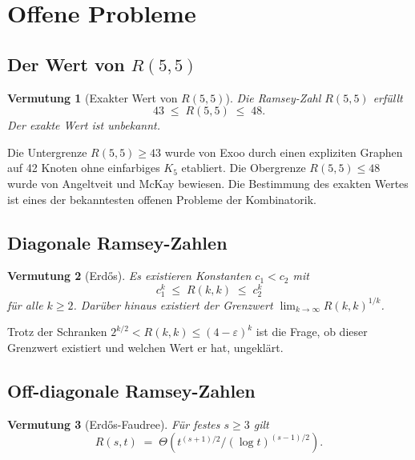 \documentclass[12pt,a4paper]{amsart}
\newtheorem{conjecture}{Vermutung}
\theoremstyle{definition}
\theoremstyle{remark}
\begin{document}
\section{Offene Probleme}

\subsection{Der Wert von \texorpdfstring{$R(5,5)$}{R(5,5)}}

\begin{conjecture}[Exakter Wert von $R(5,5)$]\label{verm:r55}
Die Ramsey-Zahl $R(5,5)$ erf\"ullt
\[
  43 \;\le\; R(5,5) \;\le\; 48.
\]
Der exakte Wert ist unbekannt.
\end{conjecture}

Die Untergrenze $R(5,5) \ge 43$ wurde von Exoo \cite{Exoo1989} durch einen
expliziten Graphen auf 42 Knoten ohne einfarbiges $K_5$ etabliert.  Die Obergrenze
$R(5,5) \le 48$ wurde von Angeltveit und McKay \cite{AngeltveitMcKay2017} bewiesen.
Die Bestimmung des exakten Wertes ist eines der bekanntesten offenen Probleme der
Kombinatorik.

\subsection{Diagonale Ramsey-Zahlen}

\begin{conjecture}[Erd\H{o}s]\label{verm:diagonal}
Es existieren Konstanten $c_1 < c_2$ mit
\[
  c_1^k \;\le\; R(k,k) \;\le\; c_2^k
\]
f\"ur alle $k \ge 2$.  Dar\"uber hinaus existiert der Grenzwert
$\lim_{k\to\infty} R(k,k)^{1/k}$.
\end{conjecture}

Trotz der Schranken $2^{k/2} < R(k,k) \le (4-\varepsilon)^k$ ist die Frage,
ob dieser Grenzwert existiert und welchen Wert er hat, ungekl\"art.

\subsection{Off-diagonale Ramsey-Zahlen}

\begin{conjecture}[Erd\H{o}s-Faudree]\label{verm:offdiag}
F\"ur festes $s \ge 3$ gilt
\[
  R(s,t) \;=\; \Theta\!\left(t^{(s+1)/2} / (\log t)^{(s-1)/2}\right).
\]
\end{conjecture}
\end{document}
